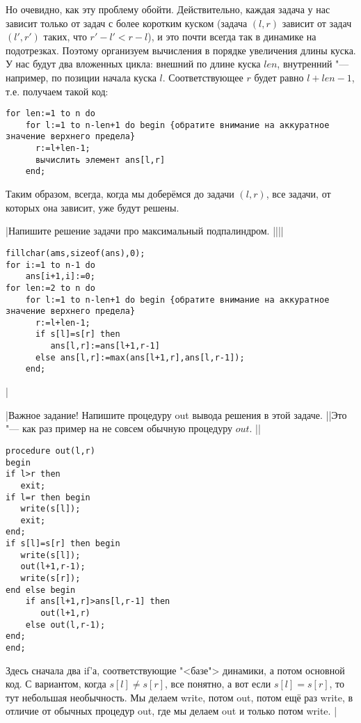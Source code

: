 Но очевидно, как эту проблему обойти. Действительно, каждая задача у нас зависит только от задач с более коротким куском (задача $(l,r)$ зависит от задач $(l',r')$ таких, что $r'-l'<r-l$), и это почти всегда так в динамике на подотрезках. Поэтому организуем вычисления в порядке увеличения длины куска. У нас будут два вложенных цикла: внешний по длине куска $len$, внутренний "--- например, по позиции начала куска $l$. Соответствующее $r$ будет равно $l+len-1$, т.е. получаем такой код:

\begin{codesampleo}\begin{verbatim}
for len:=1 to n do
    for l:=1 to n-len+1 do begin {обратите внимание на аккуратное значение верхнего предела}
      r:=l+len-1;
      вычислить элемент ans[l,r]
    end;
\end{verbatim}
\end{codesampleo}

Таким образом, всегда, когда мы доберёмся до задачи $(l,r)$, все задачи, от которых она зависит, уже будут решены.

\task|Напишите решение задачи про максимальный подпалиндром.
||||
\begin{codesampleo}\begin{verbatim}
fillchar(ams,sizeof(ans),0);
for i:=1 to n-1 do
    ans[i+1,i]:=0;
for len:=2 to n do
    for l:=1 to n-len+1 do begin {обратите внимание на аккуратное значение верхнего предела}
      r:=l+len-1;
      if s[l]=s[r] then
         ans[l,r]:=ans[l+1,r-1]
      else ans[l,r]:=max(ans[l+1,r],ans[l,r-1]);
    end;
\end{verbatim}
\end{codesampleo}
|

\task|Важное задание! Напишите процедуру out вывода решения в этой задаче.
||Это "--- как раз пример на не совсем обычную процедуру $out$.
||
\begin{codesample}\begin{verbatim}
procedure out(l,r)
begin
if l>r then
   exit;
if l=r then begin
   write(s[l]);
   exit;
end;
if s[l]=s[r] then begin
   write(s[l]);
   out(l+1,r-1);
   write(s[r]);
end else begin
    if ans[l+1,r]>ans[l,r-1] then
       out(l+1,r)
    else out(l,r-1);
end;
end;
\end{verbatim}
\end{codesample}
Здесь сначала два if'а, соответствующие "<базе"> динамики, а потом основной код. С вариантом, когда 
$s[l]\neq s[r]$, все понятно, а вот если $s[l]=s[r]$, то тут небольшая необычность. Мы делаем 
write, потом out, потом ещё раз write, в отличие от обычных процедур out, где мы делаем out и 
только потом write.
|

